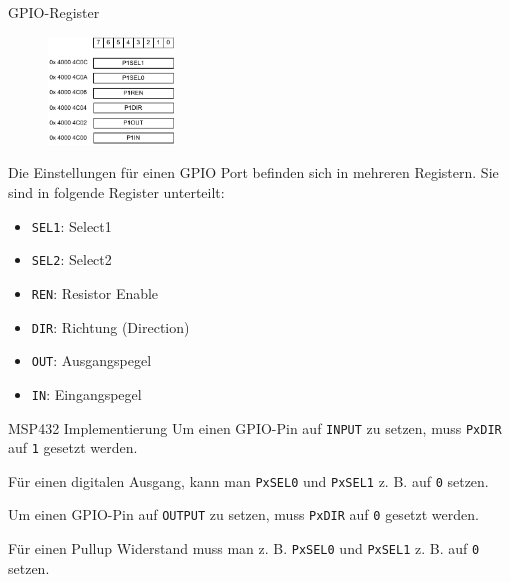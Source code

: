 \begin{defi}{GPIO-Register}
    \begin{figure}
        \begin{center}
            \includegraphics[width=0.3\textwidth]{includes/figures/defi_msp432_port.pdf}
        \end{center}
    \end{figure}
    Die Einstellungen für einen GPIO Port befinden sich in mehreren Registern.
    Sie sind in folgende Register unterteilt:
    \begin{itemize}
        \item \texttt{SEL1}: Select1
        \item \texttt{SEL2}: Select2
        \item \texttt{REN}: Resistor Enable
        \item \texttt{DIR}: Richtung (Direction)
        \item \texttt{OUT}: Ausgangspegel
        \item \texttt{IN}: Eingangspegel
    \end{itemize}
\end{defi}

\begin{bonus}{MSP432 Implementierung}
    Um einen GPIO-Pin auf \texttt{INPUT} zu setzen, muss \texttt{PxDIR} auf \texttt{1} gesetzt werden.

    Für einen digitalen Ausgang, kann man \texttt{PxSEL0} und \texttt{PxSEL1} z. B. auf \texttt{0} setzen.

    Um einen GPIO-Pin auf \texttt{OUTPUT} zu setzen, muss \texttt{PxDIR} auf \texttt{0} gesetzt werden.

    Für einen Pullup Widerstand muss man z. B. \texttt{PxSEL0} und \texttt{PxSEL1} z. B. auf \texttt{0} setzen.
\end{bonus}

